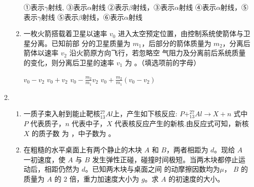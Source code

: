 \begin{enumerate}
\begin{enumerate}
\fourchoices
{①表示$ \gamma $射线, ③表示$ \alpha $射线}
{②表示$ \beta $射线，③表示$ \alpha $射线}
{④表示$ \alpha $射线，⑤表示$ \gamma $射线}
{⑤表示$ \beta $射线，⑥表示$ \alpha $射线}


 
\item 
一枚火箭搭载着卫星以速率 $ v_{0} $ 进入太空预定位置，由控制系统使箭体与卫星分离。已知前部
分的卫星质量为 $ m_{1} $，后部分的箭体质量为 $ m_{2} $，分离后箭体以速率 $ v_{2} $ 沿火箭原方向飞行，若忽略空
气阻力及分离前后系统质量的变化，则分离后卫星的速率 $ v_{1} $ 为 \underlinegap 。（填选项前的字母）
\begin{figure}[h!]
	\centering
	
\end{figure}


\fourchoices
{$ v_{0}-v_{2}$}
{$ v_{0}+v_{2}$}
{$ v_{0}-\frac{m_{2}}{m_{1}} v_{2} $}
{$ v_{0}+\frac{m_{2}}{m_{1}}\left(v_{0}-v_{2}\right)$}




\end{enumerate}


\item 
{}
\begin{enumerate}
	\item
一质子束入射到能止靶核$ ^{27}_{13}Al $上，产生如下核反应:
$ P + ^{27}_{13}Al \rightarrow X + n $
式中 $ P $ 代表质子，$ n $ 代表中子，$ X $ 代表核反应产生的新核.由反应式可知，新核 $ X $ 的质子数
为 \underlinegap ，中子数为 \underlinegap 。



\item 
在粗糙的水平桌面上有两个静止的木块 $ A $ 和 $ B $，两者相距为 $ d $。现给 $ A $ 一初速度，使 $ A $ 与
$ B $ 发生弹性正碰，碰撞时间极短。当两木块都停止运动后，相距仍然为 $ d $。已知两木块与桌面之间
的动摩擦因数均为$ \mu $， $ B $ 的质量为 $ A $ 的 $ 2 $ 倍，重力加速度大小为 $ g $。求 $ A $ 的初速度的大小。




\end{enumerate}



\end{enumerate}
